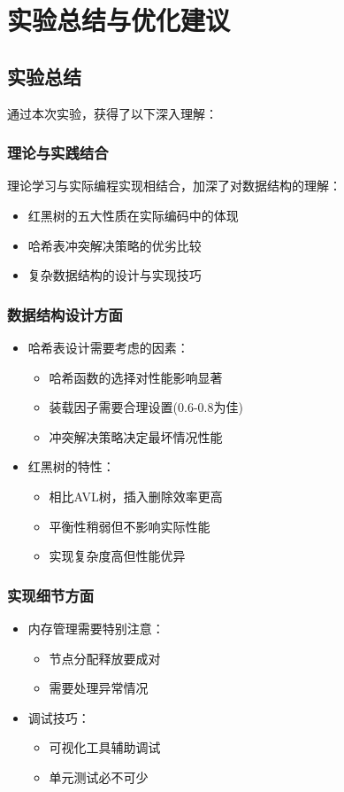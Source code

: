 \documentclass[12pt,a4paper]{article}
\begin{document}
\section{实验总结与优化建议}

\subsection{实验总结}
通过本次实验，获得了以下深入理解：

\subsubsection{理论与实践结合}
理论学习与实际编程实现相结合，加深了对数据结构的理解：
\begin{itemize}
\item 红黑树的五大性质在实际编码中的体现
\item 哈希表冲突解决策略的优劣比较
\item 复杂数据结构的设计与实现技巧
\end{itemize}

\subsubsection{数据结构设计方面}
\begin{itemize}
\item 哈希表设计需要考虑的因素：
  \begin{itemize}
  \item 哈希函数的选择对性能影响显著
  \item 装载因子需要合理设置(0.6-0.8为佳)
  \item 冲突解决策略决定最坏情况性能
  \end{itemize}
\item 红黑树的特性：
  \begin{itemize}
  \item 相比AVL树，插入删除效率更高
  \item 平衡性稍弱但不影响实际性能
  \item 实现复杂度高但性能优异
  \end{itemize}
\end{itemize}

\subsubsection{实现细节方面}
\begin{itemize}
\item 内存管理需要特别注意：
  \begin{itemize}
  \item 节点分配释放要成对
  \item 需要处理异常情况
  \end{itemize}
\item 调试技巧：
  \begin{itemize}
  \item 可视化工具辅助调试
  \item 单元测试必不可少
  \end{itemize}
\end{itemize}
\end{document}
